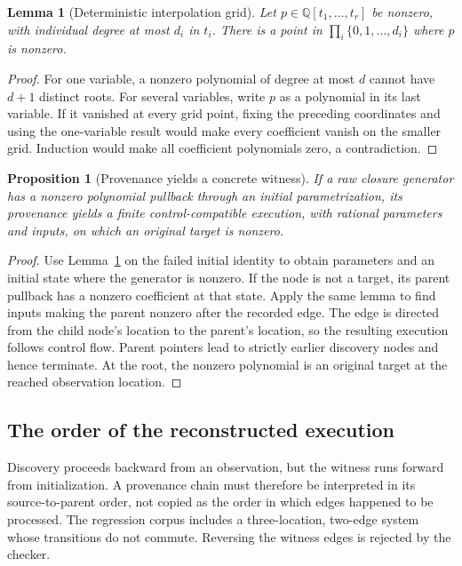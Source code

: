 \documentclass[11pt,letterpaper]{article}
\newtheorem{proposition}[theorem]{Proposition}
\newtheorem{lemma}[theorem]{Lemma}
\theoremstyle{definition}
\newcommand{\Q}{\mathbb Q}
\begin{document}
\begin{lemma}[Deterministic interpolation grid]\label{lem:grid}
Let $p\in\Q[t_1,\ldots,t_r]$ be nonzero, with individual degree at most $d_i$
in $t_i$. There is a point in
$\prod_i\{0,1,\ldots,d_i\}$ where $p$ is nonzero.
\end{lemma}
\begin{proof}
For one variable, a nonzero polynomial of degree at most $d$ cannot have $d+1$
distinct roots. For several variables, write $p$ as a polynomial in its last
variable. If it vanished at every grid point, fixing the preceding coordinates
and using the one-variable result would make every coefficient vanish on the
smaller grid. Induction would make all coefficient polynomials zero, a
contradiction.
\end{proof}

\begin{proposition}[Provenance yields a concrete witness]
If a raw closure generator has a nonzero polynomial pullback through an initial
parametrization, its provenance yields a finite control-compatible execution,
with rational parameters and inputs, on which an original target is nonzero.
\end{proposition}
\begin{proof}
Use Lemma~\ref{lem:grid} on the failed initial identity to obtain parameters and
an initial state where the generator is nonzero. If the node is not a target,
its parent pullback has a nonzero coefficient at that state. Apply the same
lemma to find inputs making the parent nonzero after the recorded edge.
The edge is directed from the child node's location to the parent's location,
so the resulting execution follows control flow. Parent pointers lead to
strictly earlier discovery nodes and hence terminate. At the root, the
nonzero polynomial is an original target at the reached observation location.
\end{proof}

\subsection{The order of the reconstructed execution}
Discovery proceeds backward from an observation, but the witness runs forward
from initialization. A provenance chain must therefore be interpreted in its
source-to-parent order, not copied as the order in which edges happened to be
processed. The regression corpus includes a three-location, two-edge system
whose transitions do not commute. Reversing the witness edges is rejected by
the checker.
\end{document}
